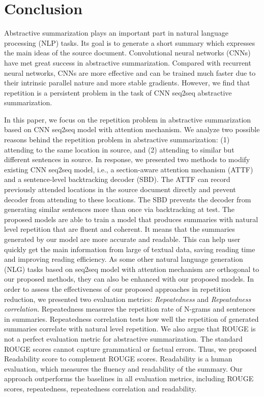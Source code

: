 \section{Conclusion}
\label{sec:conclude}
Abstractive summarization plays an important part in natural 
language processing (NLP) tasks.
Its goal is to generate a short summary which expresses the main ideas 
of the source document.
Convolutional neural networks (CNNs) have
met great success in abstractive summarization.
Compared with recurrent neural networks, 
CNNs are more effective and can be trained much faster due to 
their intrinsic parallel nature and more stable gradients.
However, we find that repetition is a persistent problem in the task of CNN seq2seq abstractive summarization. 

In this paper, we focus on the repetition problem in abstractive summarization based on CNN seq2seq model with attention mechanism.
We analyze two possible reasons behind the repetition problem in abstractive
summarization: (1) attending to the same location in source,
and (2) attending to similar but different sentences in source. 
In response, 
we presented two methods to modify existing CNN seq2seq model, i.e.,
a section-aware attention mechanism (ATTF)
and a sentence-level backtracking decoder (SBD). 
The ATTF can record previously attended locations in the source document directly 
and prevent decoder from attending to these locations. 
The SBD prevents the decoder from generating similar sentences more than once via backtracking at test.
The proposed models are able to train a model that produces 
summaries with natural level repetition that are fluent and coherent. 
It means that the summaries generated by our model are more accurate and 
readable. This can help user quickly get the main information from large of textual data,
saving reading time and improving reading efficiency.
As some other natural language generation (NLG) tasks based on seq2seq model with attention mechanism
are orthogonal to our proposed methods,
they can also be enhanced with our proposed models.
In order to assess the effectiveness of our proposed approaches in repetition reduction, 
we presented two evaluation metrics: \textit{Repeatedness} and \textit{Repeatedness correlation}.
Repeatedness measures the repetition rate of N-grams and sentences in summaries. 
Repeatedness correlation tests how well the repetition of generated summaries 
correlate with natural level repetition.
We also argue that ROUGE is not a perfect evaluation metric for abstractive 
summarization. The standard ROUGE scores cannot capture grammatical or factual errors.
Thus, we proposed Readability score to complement ROUGE scores.
Readability is a human evaluation, which measures the fluency and readability of the
summary. 
Our approach outperforms the baselines in 
all evaluation metrics, including ROUGE scores, repeatedness, 
repeatedness correlation and readability.
